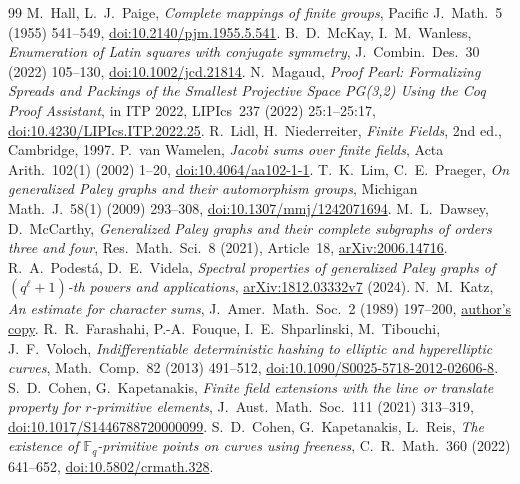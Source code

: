 \documentclass[11pt]{article}
\begin{document}
\begin{thebibliography}{99}
 M.~Hall, L.~J.~Paige, \emph{Complete mappings of finite groups},
Pacific J.~Math.~5 (1955) 541--549,
\href{https://doi.org/10.2140/pjm.1955.5.541}{doi:10.2140/pjm.1955.5.541}.
 B.~D.~McKay, I.~M.~Wanless,
\emph{Enumeration of Latin squares with conjugate symmetry},
J.~Combin.~Des.~30 (2022) 105--130,
\href{https://doi.org/10.1002/jcd.21814}{doi:10.1002/jcd.21814}.
 N.~Magaud,
\emph{Proof Pearl: Formalizing Spreads and Packings of the Smallest Projective
Space PG(3,2) Using the Coq Proof Assistant}, in ITP 2022,
LIPIcs~237 (2022) 25:1--25:17,
\href{https://doi.org/10.4230/LIPIcs.ITP.2022.25}{doi:10.4230/LIPIcs.ITP.2022.25}.
 R.~Lidl, H.~Niederreiter, \emph{Finite Fields}, 2nd ed., Cambridge, 1997.
 P.~van Wamelen, \emph{Jacobi sums over finite fields},
Acta Arith.~102(1) (2002) 1--20,
\href{https://doi.org/10.4064/aa102-1-1}{doi:10.4064/aa102-1-1}.
 T.~K.~Lim, C.~E.~Praeger,
\emph{On generalized Paley graphs and their automorphism groups},
Michigan Math.~J.~58(1) (2009) 293--308,
\href{https://doi.org/10.1307/mmj/1242071694}{doi:10.1307/mmj/1242071694}.
 M.~L.~Dawsey, D.~McCarthy,
\emph{Generalized Paley graphs and their complete subgraphs of orders
three and four}, Res.~Math.~Sci.~8 (2021), Article~18,
\href{https://arxiv.org/abs/2006.14716}{arXiv:2006.14716}.
 R.~A.~Podest\'a, D.~E.~Videla,
\emph{Spectral properties of generalized Paley graphs of
$(q^\ell+1)$-th powers and applications},
\href{https://arxiv.org/abs/1812.03332v7}{arXiv:1812.03332v7} (2024).
 N.~M.~Katz, \emph{An estimate for character sums},
J.~Amer.~Math.~Soc.~2 (1989) 197--200,
\href{https://web.math.princeton.edu/~nmk/old/estcharsums.pdf}{author's copy}.
 R.~R.~Farashahi, P.-A.~Fouque, I.~E.~Shparlinski,
M.~Tibouchi, J.~F.~Voloch, \emph{Indifferentiable deterministic hashing
to elliptic and hyperelliptic curves}, Math.~Comp.~82 (2013) 491--512,
\href{https://doi.org/10.1090/S0025-5718-2012-02606-8}{doi:10.1090/S0025-5718-2012-02606-8}.
 S.~D.~Cohen, G.~Kapetanakis,
\emph{Finite field extensions with the line or translate property for
$r$-primitive elements}, J.~Aust.~Math.~Soc.~111 (2021) 313--319,
\href{https://doi.org/10.1017/S1446788720000099}{doi:10.1017/S1446788720000099}.
 S.~D.~Cohen, G.~Kapetanakis, L.~Reis,
\emph{The existence of $\mathbb F_q$-primitive points on curves using
freeness}, C.~R.~Math.~360 (2022) 641--652,
\href{https://doi.org/10.5802/crmath.328}{doi:10.5802/crmath.328}.

\end{thebibliography}
\end{document}
